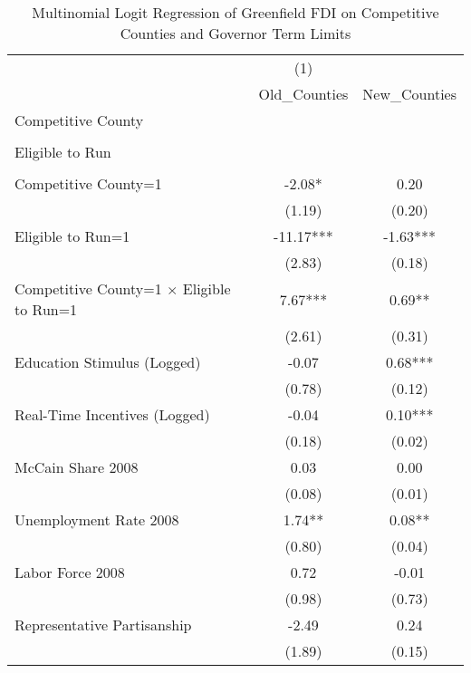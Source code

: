 \begin{table}[!htbp]\centering
\def\sym#1{\ifmmode^{#1}\else\(^{#1}\)\fi}
\caption{Multinomial Logit Regression of Greenfield FDI on Competitive Counties and Governor Term Limits}
\begin{tabular}{l*{2}{c}}
\hline\hline
                    &         (1)   &               \\
                    &Old_Counties   &New_Counties   \\
\hline
Competitive County  &               &               \\
                    &               &               \\
Eligible to Run     &               &               \\
                    &               &               \\
Competitive County=1&       -2.08*  &        0.20   \\
                    &      (1.19)   &      (0.20)   \\
Eligible to Run=1   &      -11.17***&       -1.63***\\
                    &      (2.83)   &      (0.18)   \\
Competitive County=1 $\times$ Eligible to Run=1&        7.67***&        0.69** \\
                    &      (2.61)   &      (0.31)   \\
Education Stimulus (Logged)&       -0.07   &        0.68***\\
                    &      (0.78)   &      (0.12)   \\
Real-Time Incentives (Logged)&       -0.04   &        0.10***\\
                    &      (0.18)   &      (0.02)   \\
McCain Share 2008   &        0.03   &        0.00   \\
                    &      (0.08)   &      (0.01)   \\
Unemployment Rate 2008 &        1.74** &        0.08** \\
                    &      (0.80)   &      (0.04)   \\
Labor Force 2008    &        0.72   &       -0.01   \\
                    &      (0.98)   &      (0.73)   \\
Representative Partisanship&       -2.49   &        0.24   \\
                    &      (1.89)   &      (0.15)   \\

\end{tabular}
\end{table}
